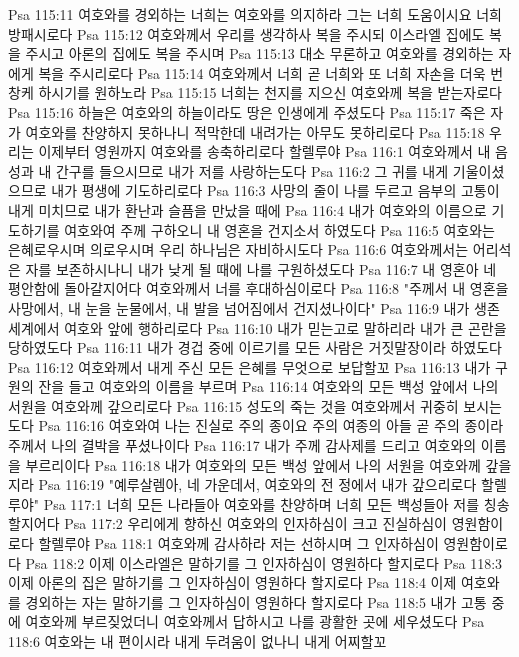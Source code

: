 Psa 115:11  여호와를 경외하는 너희는 여호와를 의지하라 그는 너희 도움이시요 너희 방패시로다
Psa 115:12  여호와께서 우리를 생각하사 복을 주시되 이스라엘 집에도 복을 주시고 아론의 집에도 복을 주시며
Psa 115:13  대소 무론하고 여호와를 경외하는 자에게 복을 주시리로다
Psa 115:14  여호와께서 너희 곧 너희와 또 너희 자손을 더욱 번창케 하시기를 원하노라
Psa 115:15  너희는 천지를 지으신 여호와께 복을 받는자로다
Psa 115:16  하늘은 여호와의 하늘이라도 땅은 인생에게 주셨도다
Psa 115:17  죽은 자가 여호와를 찬양하지 못하나니 적막한데 내려가는 아무도 못하리로다
Psa 115:18  우리는 이제부터 영원까지 여호와를 송축하리로다 할렐루야
Psa 116:1  여호와께서 내 음성과 내 간구를 들으시므로 내가 저를 사랑하는도다
Psa 116:2  그 귀를 내게 기울이셨으므로 내가 평생에 기도하리로다
Psa 116:3  사망의 줄이 나를 두르고 음부의 고통이 내게 미치므로 내가 환난과 슬픔을 만났을 때에
Psa 116:4  내가 여호와의 이름으로 기도하기를 여호와여 주께 구하오니 내 영혼을 건지소서 하였도다
Psa 116:5  여호와는 은혜로우시며 의로우시며 우리 하나님은 자비하시도다
Psa 116:6  여호와께서는 어리석은 자를 보존하시나니 내가 낮게 될 때에 나를 구원하셨도다
Psa 116:7  내 영혼아 네 평안함에 돌아갈지어다 여호와께서 너를 후대하심이로다
Psa 116:8  "주께서 내 영혼을 사망에서, 내 눈을 눈물에서, 내 발을 넘어짐에서 건지셨나이다"
Psa 116:9  내가 생존 세계에서 여호와 앞에 행하리로다
Psa 116:10  내가 믿는고로 말하리라 내가 큰 곤란을 당하였도다
Psa 116:11  내가 경겁 중에 이르기를 모든 사람은 거짓말장이라 하였도다
Psa 116:12  여호와께서 내게 주신 모든 은혜를 무엇으로 보답할꼬
Psa 116:13  내가 구원의 잔을 들고 여호와의 이름을 부르며
Psa 116:14  여호와의 모든 백성 앞에서 나의 서원을 여호와께 갚으리로다
Psa 116:15  성도의 죽는 것을 여호와께서 귀중히 보시는도다
Psa 116:16  여호와여 나는 진실로 주의 종이요 주의 여종의 아들 곧 주의 종이라 주께서 나의 결박을 푸셨나이다
Psa 116:17  내가 주께 감사제를 드리고 여호와의 이름을 부르리이다
Psa 116:18  내가 여호와의 모든 백성 앞에서 나의 서원을 여호와께 갚을지라
Psa 116:19  "예루살렘아, 네 가운데서, 여호와의 전 정에서 내가 갚으리로다 할렐루야"
Psa 117:1  너희 모든 나라들아 여호와를 찬양하며 너희 모든 백성들아 저를 칭송할지어다
Psa 117:2  우리에게 향하신 여호와의 인자하심이 크고 진실하심이 영원함이로다 할렐루야
Psa 118:1  여호와께 감사하라 저는 선하시며 그 인자하심이 영원함이로다
Psa 118:2  이제 이스라엘은 말하기를 그 인자하심이 영원하다 할지로다
Psa 118:3  이제 아론의 집은 말하기를 그 인자하심이 영원하다 할지로다
Psa 118:4  이제 여호와를 경외하는 자는 말하기를 그 인자하심이 영원하다 할지로다
Psa 118:5  내가 고통 중에 여호와께 부르짖었더니 여호와께서 답하시고 나를 광활한 곳에 세우셨도다
Psa 118:6  여호와는 내 편이시라 내게 두려움이 없나니 내게 어찌할꼬
